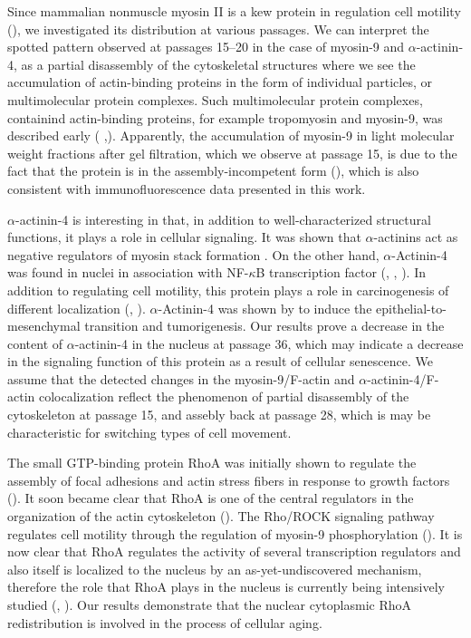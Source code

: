 \documentclass[alpha-refs]{wiley-article}
\begin{document}
Since mammalian nonmuscle myosin II is a kew protein in regulation cell motility (\cite{shutova2018mammalian}), we investigated its distribution at various passages.
We can interpret the spotted pattern observed at passages 15--20 in the case of myosin-9 and $\alpha$-actinin-4, as a partial disassembly of the cytoskeletal structures where we see the accumulation of actin-binding proteins in the form of individual particles, or multimolecular protein complexes.
Such multimolecular protein complexes, containind actin-binding proteins, for example tropomyosin and myosin-9, was described early (\cite{grenklo2008tropomyosin} ,\cite{bobkov2017effect}).
Apparently, the accumulation of myosin-9 in light molecular weight fractions after gel filtration, which we observe at passage 15, is due to the fact that the protein is in the assembly-incompetent form (\cite{vicente2009non}), which is also consistent with immunofluorescence data presented in this work.

$\alpha$-actinin-4 is interesting in that, in addition to well-characterized structural functions, it plays a role in cellular signaling.
It was shown that $\alpha$-actinins act as negative regulators of myosin stack formation \cite{hu2019reciprocal}.
On the other hand, $\alpha$-Actinin-4 was found in nuclei in association with NF-$\kappa$B transcription factor (\cite{bolshakova2007extra}, \cite{babakov2008rela}, \cite{lomert2018co}).
In addition to regulating cell motility, this protein plays a role in carcinogenesis of different localization (\cite{barbolina2008motility}, \cite{hsu2013alpha}).
$\alpha$-Actinin-4 was shown by \cite{an2016alpha} to induce the epithelial-to-mesenchymal transition and tumorigenesis.
Our results prove a decrease in the content of $\alpha$-actinin-4 in the nucleus at passage 36, which may indicate a decrease in the signaling function of this protein as a result of cellular senescence.
We assume that the detected changes in the myosin-9/F-actin and $\alpha$-actinin-4/F-actin colocalization reflect the phenomenon of partial disassembly of the cytoskeleton at passage 15, and assebly back at passage 28, which is may be characteristic for switching types of cell movement.

The small GTP-binding protein RhoA was initially shown to regulate the
assembly of focal adhesions and actin stress fibers in response to growth
factors (\cite{ridley1992small}).
It soon became clear that RhoA is one of the central regulators in the organization of the actin cytoskeleton (\cite{burridge2004rho}).
The Rho/ROCK signaling pathway regulates cell motility through the regulation of myosin-9 phosphorylation (\cite{elliott2015myosin}).
It is now clear that RhoA regulates the activity of several transcription regulators and also itself is localized to the nucleus by an as-yet-undiscovered mechanism, therefore the role that RhoA plays in the nucleus is currently being intensively studied (\cite{guilluy2011analysis}, \cite{kim2018regulation}).
Our results demonstrate that the nuclear cytoplasmic RhoA redistribution is involved in the process of cellular aging.
\end{document}
